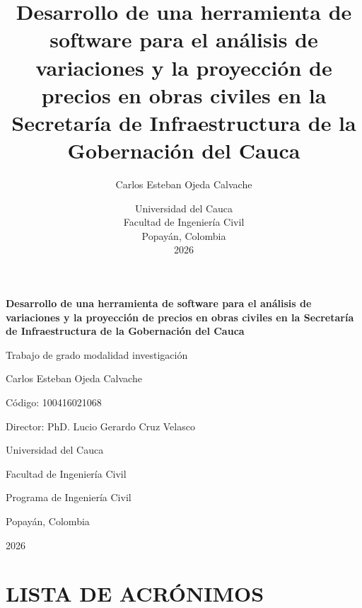 \documentclass[12pt,letterpaper]{article}
\title{Desarrollo de una herramienta de software para el análisis de variaciones y la proyección de precios en obras civiles en la Secretaría de Infraestructura de la Gobernación del Cauca}
\author{Carlos Esteban Ojeda Calvache}
\date{Universidad del Cauca\\Facultad de Ingeniería Civil\\Popayán, Colombia\\2026}
\begin{document}
\hypersetup{pageanchor=false}

\begin{titlepage}
    \centering
    \vspace*{1.2cm}
    {\Large\bfseries Desarrollo de una herramienta de software para el análisis de variaciones y la proyección de precios en obras civiles en la Secretaría de Infraestructura de la Gobernación del Cauca\par}
    \vspace{1.2cm}
    {\large Trabajo de grado modalidad investigación\par}
    \vspace{1.4cm}
    {\large Carlos Esteban Ojeda Calvache\par}
    \vspace{0.3cm}
    {\large Código: 100416021068\par}
    \vspace{1cm}
    {\large Director: PhD. Lucio Gerardo Cruz Velasco\par}
    \vspace{1.2cm}
    {\large Universidad del Cauca\par}
    {\large Facultad de Ingeniería Civil\par}
    {\large Programa de Ingeniería Civil\par}
    \vspace{0.8cm}
    {\large Popayán, Colombia\par}
    {\large 2026\par}
    \vfill
\end{titlepage}
\hypersetup{pageanchor=true}

\tableofcontents
\newpage
{}
{}
\listoftables
\newpage
{}
{}
\listoffigures
\newpage

\section*{LISTA DE ACRÓNIMOS}
\end{document}
